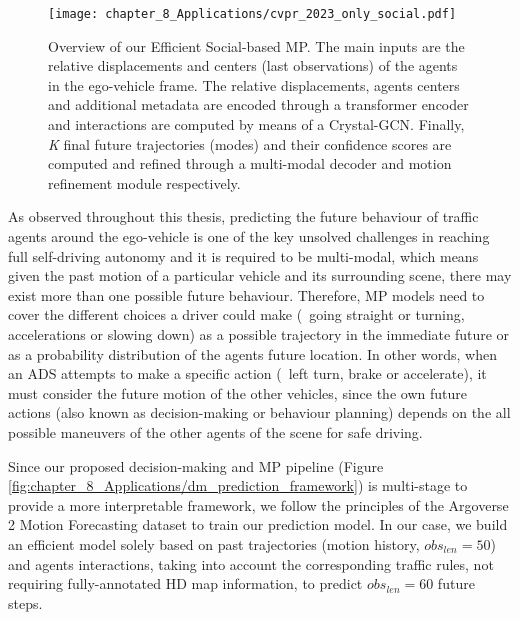 \begin{figure}[h]
	\centering
	\setlength{\tabcolsep}{2.0pt}
	\texttt{[image: chapter\_8\_Applications/cvpr\_2023\_only\_social.pdf]}
	\captionsetup{justification=justified}
	\caption[Overview of our Efficient Social-based \ac{MP}]{Overview of our Efficient Social-based \ac{MP}. The main inputs are the relative displacements and centers (last observations) of the agents in the ego-vehicle frame. The relative displacements, agents centers and additional metadata are encoded through a transformer encoder and interactions are computed by means of a Crystal-\ac{GCN}. Finally, \textit{K} final future trajectories (modes) and their confidence scores are computed and refined through a multi-modal decoder and motion refinement module respectively.}
	
	\label{fig:chapter_8_Applications/cvpr_2023_only_social}
\end{figure}

As observed throughout this thesis, predicting the future behaviour of traffic agents around the ego-vehicle is one of the key unsolved challenges in reaching full self-driving autonomy and it is required to be multi-modal, which means given the past motion of a particular vehicle and its surrounding scene, there may exist more than one possible future behaviour. Therefore, MP models need to cover the different choices a driver could make (\ie \ going straight or turning, accelerations or slowing down) as a possible trajectory in the immediate future or as a probability distribution of the agents future location. In other words, when an \ac{ADS} attempts to make a specific action (\eg \ left turn, brake or accelerate), it must consider the future motion of the other vehicles, since the own future actions (also known as decision-making or behaviour planning) depends on the all possible maneuvers of the other agents of the scene for safe driving. %

Since our proposed decision-making and \ac{MP} pipeline (Figure \ref{fig:chapter_8_Applications/dm_prediction_framework}) is multi-stage to provide a more interpretable framework, we follow the principles of the Argoverse 2 Motion Forecasting dataset \cite{wilson2023argoverse} to train our prediction model. In our case, we build an efficient model solely based on past trajectories (motion history, $obs_{len} = 50$) and agents interactions, taking into account the corresponding traffic rules, not requiring fully-annotated HD map information, to predict $obs_{len} = 60$ future steps. %

